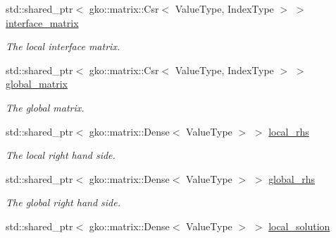 \begin{DoxyCompactItemize}
\mbox{\label{classSchwarzWrappers_1_1SchwarzBase_aea6575d93a87dec1f97ef2f40ff87199}} 
std\+::shared\+\_\+ptr$<$ gko\+::matrix\+::\+Csr$<$ Value\+Type, Index\+Type $>$ $>$ \hyperlink{classSchwarzWrappers_1_1SchwarzBase_aea6575d93a87dec1f97ef2f40ff87199}{interface\+\_\+matrix}
\begin{DoxyCompactList}\small\item\em The local interface matrix. \end{DoxyCompactList}\item 
\mbox{\label{classSchwarzWrappers_1_1SchwarzBase_a7dc6207713163fb9298ff2667da9a11f}} 
std\+::shared\+\_\+ptr$<$ gko\+::matrix\+::\+Csr$<$ Value\+Type, Index\+Type $>$ $>$ \hyperlink{classSchwarzWrappers_1_1SchwarzBase_a7dc6207713163fb9298ff2667da9a11f}{global\+\_\+matrix}
\begin{DoxyCompactList}\small\item\em The global matrix. \end{DoxyCompactList}\item 
\mbox{\label{classSchwarzWrappers_1_1SchwarzBase_a7b77d55b8b5fc2c301036c2c621b002e}} 
std\+::shared\+\_\+ptr$<$ gko\+::matrix\+::\+Dense$<$ Value\+Type $>$ $>$ \hyperlink{classSchwarzWrappers_1_1SchwarzBase_a7b77d55b8b5fc2c301036c2c621b002e}{local\+\_\+rhs}
\begin{DoxyCompactList}\small\item\em The local right hand side. \end{DoxyCompactList}\item 
\mbox{\label{classSchwarzWrappers_1_1SchwarzBase_aa44d6d84a22c165ac30a61e47a126465}} 
std\+::shared\+\_\+ptr$<$ gko\+::matrix\+::\+Dense$<$ Value\+Type $>$ $>$ \hyperlink{classSchwarzWrappers_1_1SchwarzBase_aa44d6d84a22c165ac30a61e47a126465}{global\+\_\+rhs}
\begin{DoxyCompactList}\small\item\em The global right hand side. \end{DoxyCompactList}\item 
\mbox{\label{classSchwarzWrappers_1_1SchwarzBase_aa7acfcc9c34eeebc9727e00b62450c8e}} 
std\+::shared\+\_\+ptr$<$ gko\+::matrix\+::\+Dense$<$ Value\+Type $>$ $>$ \hyperlink{classSchwarzWrappers_1_1SchwarzBase_aa7acfcc9c34eeebc9727e00b62450c8e}{local\+\_\+solution}

\end{DoxyCompactItemize}
